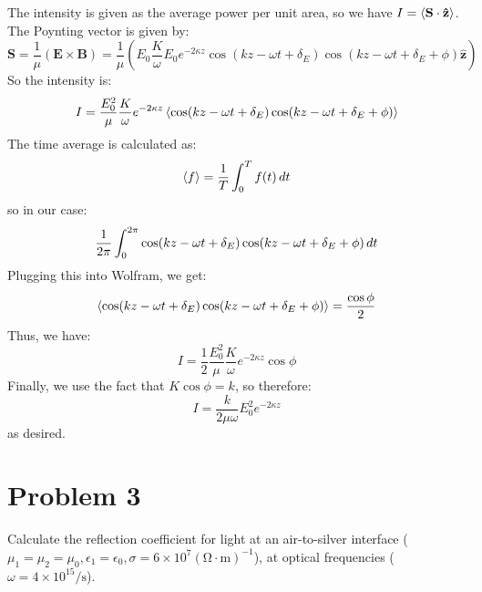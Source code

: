 \documentclass[10pt]{article}
\begin{document}
\begin{enumerate}[label=(\alph*)]
			\begin{solution}
				The intensity is given as the average power per unit area, so we have \( I = \left\langle \mathbf{S}
				\cdot \mathbf{\hat{z}} \right\rangle\). The Poynting vector is given by:
				\[
					\mathbf{S} = \frac{1}{\mu}(\mathbf{E} \times \mathbf{B}) = \frac{1}{\mu}\left(E_0
					\frac{K}{\omega}E_0 e^{-2\kappa z}\cos(kz - \omega t + \delta_E) \cos(kz - \omega t +
					\delta_E + \phi) \mathbf{\hat{z}}\right) 
				\]
				So the intensity is:
				\[
					I = \frac{E_0^2}{\mu}\frac{K}{\omega} e^{-2\kappa z}\left\langle \cos(kz - \omega t + \delta_E)
					\cos(kz - \omega t + \delta_E + \phi) \right\rangle
				\]
				The time average is calculated as:
				\[
					\left\langle f \right\rangle = \frac{1}{T}\int_{0}^{T} f(t) \,d t
				\]
				so in our case:
				\[
					\frac{1}{2\pi}\int_{0}^{2\pi}\cos(kz - \omega t + \delta_E) \cos(kz - \omega t + \delta_E
					+ \phi) \,d t
				\]
				Plugging this into Wolfram, we get:
				\[
					\left\langle \cos(kz - \omega t + \delta_E) \cos(kz - \omega t + \delta_E + \phi) \right\rangle =
					\frac{\cos\phi}{2}
				\]
				Thus, we have:
				\[
					I = \frac{1}{2}\frac{E_0^2}{\mu}\frac{K}{\omega} e^{-2\kappa z }\cos \phi
				\]
				Finally, we use the fact that \( K \cos \phi = k \), so therefore:
				\[
					I = \frac{k}{2 \mu \omega} E_0^2 e^{-2\kappa z}
				\]
				as desired. 
			\end{solution}
	\end{enumerate}
	\pagebreak
	\section*{Problem 3}
	Calculate the reflection coefficient for light at an air-to-silver interface (\( \mu_1 = \mu_2 = \mu_0,
	\epsilon_1 = \epsilon_0, \sigma = 6 \times 10^{7} (\mathrm{\Omega \cdot m})^{-1} \)), at optical
	frequencies (\( \omega = 4 \times 10^{15}\text{/s} \)). 
\end{document}

